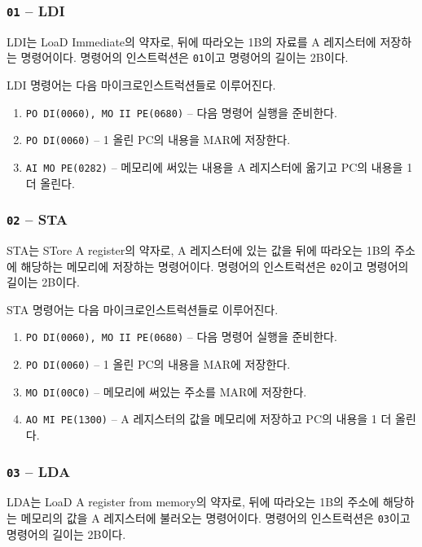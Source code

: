 \documentclass{article}
\begin{document}
\subsubsection{\texttt{01} -- LDI}

LDI는 LoaD Immediate의 약자로, 뒤에 따라오는 1B의 자료를
A 레지스터에 저장하는 명령어이다.
명령어의 인스트럭션은 \texttt{01}이고 명령어의 길이는 2B이다.

LDI 명령어는 다음 마이크로인스트럭션들로 이루어진다.

\begin{enumerate}
    \item \texttt{PO DI(0060), MO II PE(0680)} -- 다음 명령어 실행을 준비한다.
    \setcounter{enumi}{2}
    \item \texttt{PO DI(0060)} -- 1 올린 PC의 내용을 MAR에 저장한다.
    \item \texttt{AI MO PE(0282)} -- 메모리에 써있는 내용을 A 레지스터에 옮기고
        PC의 내용을 1 더 올린다.
\end{enumerate}

\subsubsection{\texttt{02} -- STA}

STA는 STore A register의 약자로, A 레지스터에 있는 값을
뒤에 따라오는 1B의 주소에 해당하는 메모리에 저장하는 명령어이다.
명령어의 인스트럭션은 \texttt{02}이고 명령어의 길이는 2B이다.

STA 명령어는 다음 마이크로인스트럭션들로 이루어진다.

\begin{enumerate}
    \item \texttt{PO DI(0060), MO II PE(0680)} -- 다음 명령어 실행을 준비한다.
    \setcounter{enumi}{2}
    \item \texttt{PO DI(0060)} -- 1 올린 PC의 내용을 MAR에 저장한다.
    \item \texttt{MO DI(00C0)} -- 메모리에 써있는 주소를 MAR에 저장한다.
    \item \texttt{AO MI PE(1300)} -- A 레지스터의 값을 메모리에 저장하고
        PC의 내용을 1 더 올린다.
\end{enumerate}

\subsubsection{\texttt{03} -- LDA}

LDA는 LoaD A register from memory의 약자로, 뒤에 따라오는 1B의 주소에 해당하는
메모리의 값을 A 레지스터에 불러오는 명령어이다.
명령어의 인스트럭션은 \texttt{03}이고 명령어의 길이는 2B이다.
\end{document}

